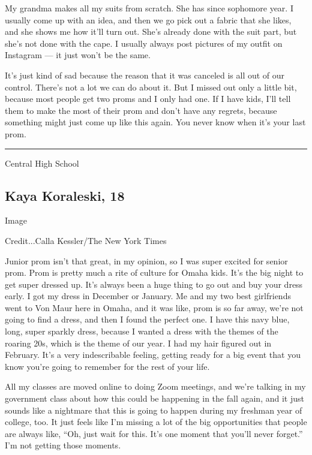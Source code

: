 My grandma makes all my suits from scratch. She has since sophomore
year. I usually come up with an idea, and then we go pick out a fabric
that she likes, and she shows me how it'll turn out. She's already done
with the suit part, but she's not done with the cape. I usually always
post pictures of my outfit on Instagram --- it just won't be the same.

It's just kind of sad because the reason that it was canceled is all out
of our control. There's not a lot we can do about it. But I missed out
only a little bit, because most people get two proms and I only had one.
If I have kids, I'll tell them to make the most of their prom and don't
have any regrets, because something might just come up like this again.
You never know when it's your last prom.

\begin{center}\rule{0.5\linewidth}{\linethickness}\end{center}

Central High School

\hypertarget{kaya-koraleski-18}{%
\subsection{Kaya Koraleski, 18}\label{kaya-koraleski-18}}

Image

Credit...Calla Kessler/The New York Times

Junior prom isn't that great, in my opinion, so I was super excited for
senior prom. Prom is pretty much a rite of culture for Omaha kids. It's
the big night to get super dressed up. It's always been a huge thing to
go out and buy your dress early. I got my dress in December or January.
Me and my two best girlfriends went to Von Maur here in Omaha, and it
was like, prom is so far away, we're not going to find a dress, and then
I found the perfect one. I have this navy blue, long, super sparkly
dress, because I wanted a dress with the themes of the roaring 20s,
which is the theme of our year. I had my hair figured out in February.
It's a very indescribable feeling, getting ready for a big event that
you know you're going to remember for the rest of your life.

All my classes are moved online to doing Zoom meetings, and we're
talking in my government class about how this could be happening in the
fall again, and it just sounds like a nightmare that this is going to
happen during my freshman year of college, too. It just feels like I'm
missing a lot of the big opportunities that people are always like,
``Oh, just wait for this. It's one moment that you'll never forget.''
I'm not getting those moments.

